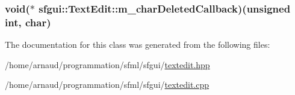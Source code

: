 \hypertarget{classsfgui_1_1TextEdit_1538508447c54b9f997fc8a68eb5c097}{
\subsubsection[m\_\-charDeletedCallback]{\setlength{\rightskip}{0pt plus 5cm}void($\ast$ {\bf sfgui::TextEdit::m\_\-charDeletedCallback})(unsigned int, char)}}
\label{classsfgui_1_1TextEdit_1538508447c54b9f997fc8a68eb5c097}




The documentation for this class was generated from the following files:\begin{CompactItemize}
\item 
/home/arnaud/programmation/sfml/sfgui/\hyperlink{textedit_8hpp}{textedit.hpp}\item 
/home/arnaud/programmation/sfml/sfgui/\hyperlink{textedit_8cpp}{textedit.cpp}\end{CompactItemize}
